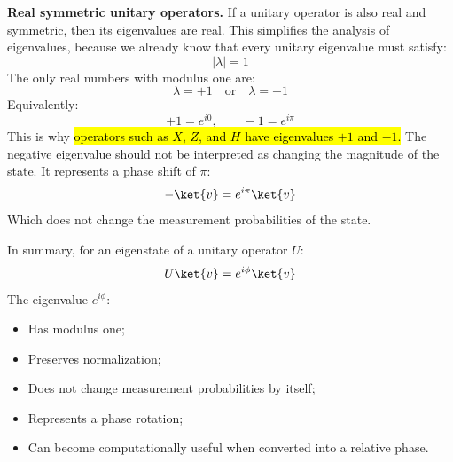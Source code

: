 \highspace
\textcolor{Green3}{ \textbf{Real symmetric unitary operators.}} If a unitary operator is also real and symmetric, then its eigenvalues are real. This simplifies the analysis of eigenvalues, because we already know that every unitary eigenvalue must satisfy:
\begin{equation*}
    \left|\lambda\right|=1
\end{equation*}
The only real numbers with modulus one are:
\begin{equation*}
    \lambda=+1\quad\text{or}\quad\lambda=-1
\end{equation*}
Equivalently:
\begin{equation*}
    +1=e^{i0},
    \qquad
    -1=e^{i\pi}
\end{equation*}
This is why \hl{operators such as $X$, $Z$, and $H$ have eigenvalues $+1$ and $-1$.} The negative eigenvalue should not be interpreted as changing the magnitude of the state. It represents a phase shift of $\pi$:
\begin{equation*}
    -\ket{v}=e^{i\pi}\ket{v}
\end{equation*}
Which does not change the measurement probabilities of the state.

\highspace
In summary, for an eigenstate  of a unitary operator $U$:
\begin{equation*}
    U\ket{v}=e^{i\phi}\ket{v}
\end{equation*}
The eigenvalue $e^{i\phi}$:
\begin{itemize}
    \item Has modulus one;
    \item Preserves normalization;
    \item Does not change measurement probabilities by itself;
    \item Represents a phase rotation;
    \item Can become computationally useful when converted into a relative phase.
\end{itemize}
